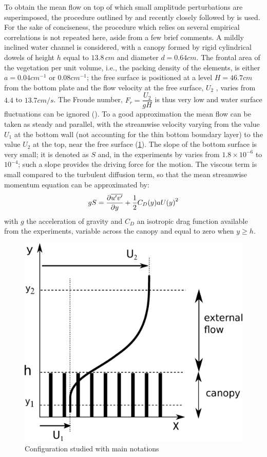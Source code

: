 To obtain the mean flow on top of which small amplitude perturbations are superimposed, the
procedure outlined by \citet{ghisalberti2004limited} and recently closely followed by \citet{zampogna2016instability} is
used. For the sake of conciseness, the procedure which relies on several empirical correlations is
not repeated here, aside from a few brief comments. A mildly inclined water channel is considered, with a canopy formed by rigid cylindrical dowels of height $h$ equal to $13.8 \, cm$ and diameter
$d = 0.64 cm$. The frontal area of the vegetation per unit volume, i.e., the packing density of the
elements, is either $a = 0.04 cm^{-1}$ or  $0.08 cm^{-1}$; the free surface is positioned at a level $H = 46.7 cm$
from the bottom plate and the flow velocity at the free surface, $U_2$ , varies from $4.4$ to $13.7 cm/s$. The
Froude number, $F_r = \dfrac{U_2}{g H} $ is thus very low and water surface fluctuations can be ignored (\citet{brevis2014experimental}). 
To a good approximation the mean flow can be taken as steady and parallel, with the streamwise
velocity varying from the value $U_1$ at the bottom wall (not accounting for the thin bottom boundary
layer) to the value $U_2$ at the top, near the free surface (\ref{fig:1}). The slope of the bottom surface is
very small; it is denoted as $S$ and, in the experiments by \citet{ghisalberti2004limited} varies from $1.8 \times 10^{-6}$ 
to $10^{-4}$; such a slope provides the driving force for the motion. The viscous term is small compared to
the turbulent diffusion term, so that the mean streamwise momentum equation can be approximated
by:
\begin{equation}
gS = \dfrac{\partial \overline{u'v'}}{\partial y} + \frac{1}{2} C_D(y) a {U(y)}^2 
\label{eq:1}
\end{equation}
with $g$ the acceleration of gravity and $C_D$ an isotropic drag function available from the experiments,
variable across the canopy and equal to zero when $y \geq h$.

\begin{figure}[h]
	\centering
	\includegraphics[width=0.5\linewidth]{chapter_3/figure/1}
	\caption{Configuration studied with main notations}
	\label{fig:1}
\end{figure}






